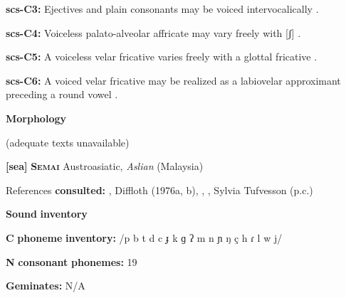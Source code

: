 \begin{styleBody}
\textbf{scs-C3:} Ejectives and plain consonants may be voiced intervocalically \citep[31]{Rice1989}.
\end{styleBody}

\begin{styleBody}
\textbf{scs-C4:} Voiceless palato-alveolar affricate may vary freely with [ʃ] \citep[35]{Rice1989}.
\end{styleBody}

\begin{styleBody}
\textbf{scs-C5:} A voiceless velar fricative varies freely with a glottal fricative \citep[32]{Rice1989}.
\end{styleBody}

\begin{styleBody}
\textbf{scs-C6:} A voiced velar fricative may be realized as a labiovelar approximant preceding a round vowel \citep[32]{Rice1989}.
\end{styleBody}

\begin{styleBody}
\textbf{Morphology}
\end{styleBody}

\begin{styleBody}
(adequate texts unavailable)
\end{styleBody}

\begin{styleBody}
\textbf{[sea]}   \textbf{\textsc{Semai}  }  Austroasiatic, \textit{Aslian} (Malaysia)
\end{styleBody}

\begin{styleBody}
References \textbf{consulted:} \citet{Dentan2003}, Diffloth (1976a, b), \citet{Philips2007}, \citet{Sloan1988}, Sylvia Tufvesson (p.c.)
\end{styleBody}

\begin{styleBody}
\textbf{Sound} \textbf{inventory}
\end{styleBody}

\begin{styleBody}
\textbf{C} \textbf{phoneme} \textbf{inventory:} /p b t d c ɟ k ɡ ʔ m n ɲ ŋ ç h ɾ l w j/
\end{styleBody}

\begin{styleBody}
\textbf{N} \textbf{consonant} \textbf{phonemes:} 19
\end{styleBody}

\begin{styleBody}
\textbf{Geminates:} N/A
\end{styleBody}

